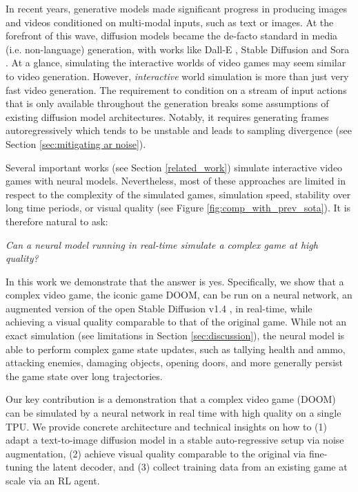\documentclass{article} %
\begin{document}
In recent years, generative models made significant progress in producing images and videos conditioned on multi-modal inputs, such as text or images. At the forefront of this wave, diffusion models became the de-facto standard in media (i.e. non-language) generation, with works like Dall-E \citep{ramesh2022hierarchical}, Stable Diffusion \citep{rombach2022high} and Sora \citep{videoworldsimulators2024}. At a glance, simulating the interactive worlds of video games may seem similar to video generation. However, \textit{interactive} world simulation is more than just very fast video generation. The requirement to condition on a stream of input actions that is only available throughout the generation breaks some assumptions of existing diffusion model architectures. Notably, it requires generating frames autoregressively which tends to be unstable and leads to sampling divergence (see Section \ref{sec:mitigating ar noise}).

Several important works \citep{ha2018worldmodels,Kim2020_GameGan,bruce2024genie} (see Section \ref{related_work}) simulate interactive video games with neural models. Nevertheless, most of these approaches are limited in respect to the complexity of the simulated games, simulation speed, stability over long time periods, or visual quality (see Figure \ref{fig:comp_with_prev_sota}).
It is therefore natural to ask:

\textit{Can a neural model running in real-time simulate a complex game at high quality?}

In this work we demonstrate that the answer is yes. Specifically, we show that a complex video game, the iconic game DOOM, can be run  on a neural network, an augmented version of the open Stable Diffusion v1.4 \citep{rombach2022high},
in real-time, while achieving a visual quality comparable to that of the original game.
While not an exact simulation (see limitations in Section \ref{sec:discussion}), the neural model is able to perform complex game state updates, such as tallying health and ammo, attacking enemies, damaging objects, opening doors, and more generally persist the game state over long trajectories.

Our key contribution is a demonstration that a complex video game (DOOM) can be simulated by a neural network in real time with high quality on a single TPU. We provide concrete architecture and technical insights on how to (1) adapt a text-to-image diffusion model in a stable auto-regressive setup via noise augmentation, (2) achieve visual quality comparable to the original via fine-tuning the latent decoder, and (3) collect training data from an existing game at scale via an RL agent.
\end{document}
